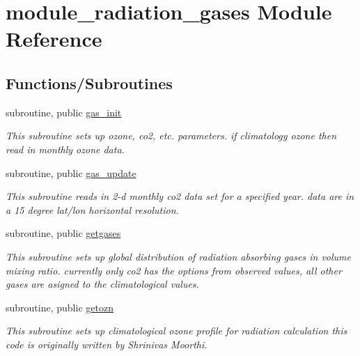 \hypertarget{namespacemodule__radiation__gases}{}\section{module\+\_\+radiation\+\_\+gases Module Reference}
\label{namespacemodule__radiation__gases}
\subsection*{Functions/\+Subroutines}
\begin{DoxyCompactItemize}
\item 
subroutine, public \hyperlink{group__module__radiation__gases_ga9b1b02edc81d3ef240e22cdaf4c7e7c1}{gas\+\_\+init}
\begin{DoxyCompactList}\small\item\em This subroutine sets up ozone, co2, etc. parameters. if climatology ozone then read in monthly ozone data. \end{DoxyCompactList}\item 
subroutine, public \hyperlink{group__module__radiation__gases_gad47ebb37ff002f7a2f4fb83b0073a172}{gas\+\_\+update}
\begin{DoxyCompactList}\small\item\em This subroutine reads in 2-\/d monthly co2 data set for a specified year. data are in a 15 degree lat/lon horizontal resolution. \end{DoxyCompactList}\item 
subroutine, public \hyperlink{group__module__radiation__gases_gad06401a54d361b3dd852d815d1b0f71e}{getgases}                                                                                           
\begin{DoxyCompactList}\small\item\em This subroutine sets up global distribution of radiation absorbing gases in volume mixing ratio. currently only co2 has the options from observed values, all other gases are asigned to the climatological values. \end{DoxyCompactList}\item 
subroutine, public \hyperlink{group__module__radiation__gases_gad43e55be9ef69dc68577237e9ce0f127}{getozn}
\begin{DoxyCompactList}\small\item\em This subroutine sets up climatological ozone profile for radiation calculation this code is originally written by Shrinivas Moorthi. \end{DoxyCompactList}\end{DoxyCompactItemize}
